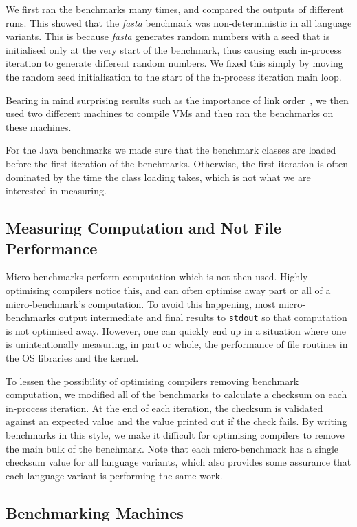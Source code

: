 \documentclass[a4paper,UKenglish]{lipics}
\newcommand{\fasta}{\emph{fasta}\xspace}
\begin{document}
We first ran the benchmarks many  times, and compared the outputs
of different runs. This showed that the \fasta benchmark was non-deterministic
in all language variants. This is because \fasta generates random numbers with
a seed that is initialised only at the very start of the benchmark, thus
causing each in-process iteration to generate different random numbers. We
fixed this simply by moving the random seed initialisation to the start
of the in-process iteration main loop.

Bearing in mind surprising
results such as the importance of link order~\cite{mytkowicz09surprising}, we
then used two different machines to compile VMs and then ran the benchmarks
on these machines.

For the Java benchmarks we made sure that the benchmark classes are loaded
before the first iteration of the benchmarks. Otherwise, the first iteration
is often dominated by the time the class loading takes, which is not what we
are interested in measuring.


\subsection{Measuring Computation and Not File Performance}

Micro-benchmarks perform computation which is not then used. Highly optimising
compilers notice this, and can often optimise away part or all of a
micro-benchmark's computation. To avoid this happening, most micro-benchmarks
output intermediate and final results to \texttt{stdout} so that computation is
not optimised away. However, one can quickly end up in a situation where one is
unintentionally measuring, in part or whole, the performance of file routines in
the OS libraries and the kernel.

To lessen the possibility of optimising compilers removing benchmark computation,
we modified all of the benchmarks to calculate a checksum on each in-process iteration.
At the end of each iteration, the checksum is validated against an expected
value and the value printed out if the check fails. By writing benchmarks in
this style, we make it difficult for optimising compilers to remove the
main bulk of the benchmark. Note that each micro-benchmark has a single checksum value for all
language variants, which also provides some assurance that each language variant is
performing the same work.


\subsection{Benchmarking Machines}
\end{document}
